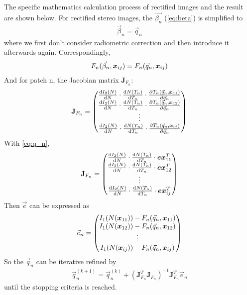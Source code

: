 The specific mathematics calculation process of rectified images  and the result are shown below. For rectified stereo images, the $\vec{\beta_n}$ (\cref{eq:beta}) is simplified to 
\begin{align}\label{eq:beta_n}
	\vec{\beta}_n = \vec{q}_n
\end{align}
where we first don't consider radiometric correction and then introduce it afterwards again. Correspondingly, 
\begin{align}
	F_n(\vec{\beta}_n, \boldsymbol{x}_{ij}) = F_n(\vec{q}_n, \boldsymbol{x}_{ij})
\end{align}
And for patch n, the Jacobian matrix $\mathbf{J}_{F_n}$: 
\begin{align}
	\mathbf{J}_{F_n} = \begin{pmatrix}
	\frac{\mathrm{d} I_2(N)}{\mathrm{d}N} \cdot \frac{\mathrm{d} N(T_n)}{\mathrm{d} T_n} \cdot \frac{\partial T_n(\vec{q}_n, \boldsymbol{x}_{11})}{\partial \vec{q}_n}\\ 
	\frac{\mathrm{d} I_2(N)}{\mathrm{d}N} \cdot\frac{\mathrm{d} N(T_n)}{\mathrm{d} T_n}\cdot \frac{\partial T_n(\vec{q}_n, \boldsymbol{x}_{12})}{\partial \vec{q}_n} \\ 
	\vdots\\ 
	\frac{\mathrm{d} I_2(N)}{\mathrm{d}N}\cdot \frac{\mathrm{d} N(T_n)}{\mathrm{d} T_n}\cdot \frac{\partial T_n(\vec{q}_n, \boldsymbol{x}_{ij})}{\partial \vec{q}_n}
	\end{pmatrix}
\end{align}
With \cref{eq:q_n}, 
\begin{align}\label{eq:j_fn}
	\mathbf{J}_{F_n} = \begin{pmatrix}\frac{\mathrm{d} I_2(N)}{\mathrm{d}N} \cdot \frac{\mathrm{d} N(T_n)}{\mathrm{d} T_n} \cdot \boldsymbol{e} \boldsymbol{x}_{11}^T\\ 
	\frac{\mathrm{d} I_2(N)}{\mathrm{d}N} \cdot\frac{\mathrm{d} N(T_n)}{\mathrm{d} T_n}\cdot \boldsymbol{e} \boldsymbol{x}_{12}^T\\ 
	\vdots\\ 
	\frac{\mathrm{d} I_2(N)}{\mathrm{d}N}\cdot \frac{\mathrm{d} N(T_n)}{\mathrm{d} T_n}\cdot \boldsymbol{e} \boldsymbol{x}_{ij}^T
	\end{pmatrix}
\end{align}
Then $\vec{e}$ can be expressed as
\begin{align} \label{eq:e_n}
	\vec{e}_{n} = \begin{pmatrix} 
	 I_1(N(\boldsymbol{x}_{11}))-F_n(\vec{q}_n, \boldsymbol{x}_{11})\\
	 I_1(N(\boldsymbol{x}_{12}))-F_n(\vec{q}_n, \boldsymbol{x}_{12})\\
	\vdots\\
	 I_1(N(\boldsymbol{x}_{ij}))-F_n(\vec{q}_n, \boldsymbol{x}_{ij})
	\end{pmatrix}
\end{align}
So the $\vec{q}_n$ can be iterative refined by 
\begin{align}
	\vec{q}_n^{(k+1)} = \vec{q}_n^{(k)} +\left(\mathbf{J}_{F_n}^{T} \mathbf{J}_{F_n} \right)^{-1} \mathbf{J}_{F_n}^{T} \vec{e}_{n}
\end{align}
until the stopping criteria is reached. 

